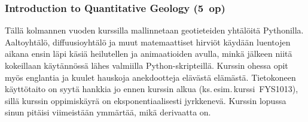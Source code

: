 \documentclass[../ala_hataile.tex]{subfiles}
\begin{document}
\subsubsection*{Introduction to Quantitative Geology (5~op)}
Tällä kolmannen vuoden kurssilla mallinnetaan geotieteiden yhtälöitä Pythonilla. Aaltoyhtälö, diffuusioyhtälö ja muut matemaattiset hirviöt käydään luentojen aikana ensin läpi käsiä heilutellen ja animaatioiden avulla, minkä jälkeen niitä kokeillaan käytännössä lähes valmiilla Python-skripteillä. Kurssin ohessa opit myös englantia ja kuulet hauskoja anekdootteja elävästä elämästä. Tietokoneen käyttötaito on syytä hankkia jo ennen kurssin alkua (ks.\,esim.\,kurssi~FYS1013), sillä kurssin oppimiskäyrä on eksponentiaalisesti jyrkkenevä. Kurssin lopussa sinun pitäisi viimeistään ymmärtää, mikä derivaatta on.
\end{document}
